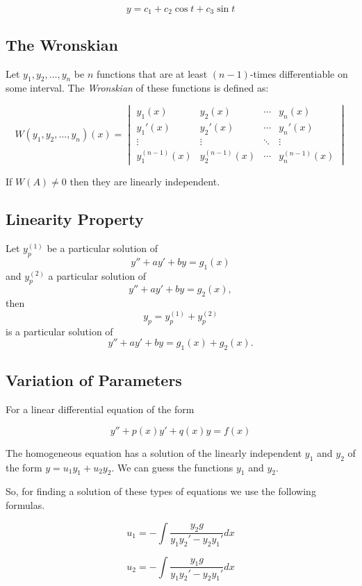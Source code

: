 \[y = c_1 + c_2 \cos t + c_3 \sin t\]

\subsection{The Wronskian}

Let \( y_1, y_2, \ldots, y_n \) be \( n \) functions that are at least 
\( (n-1) \)-times differentiable on some interval. The \emph{Wronskian} of these 
functions is defined as:

\[
W(y_1, y_2, \ldots, y_n)(x) =
\begin{vmatrix}
y_1(x) & y_2(x) & \cdots & y_n(x) \\
y_1'(x) & y_2'(x) & \cdots & y_n'(x) \\
\vdots & \vdots & \ddots & \vdots \\
y_1^{(n-1)}(x) & y_2^{(n-1)}(x) & \cdots & y_n^{(n-1)}(x)
\end{vmatrix}
\]

If \(W(A) \ne 0\) then they are linearly independent.


\subsection{Linearity Property}

Let \( y_p^{(1)} \) be a particular solution of  
\[
y'' + ay' + by = g_1(x)
\]  
and \( y_p^{(2)} \) a particular solution of  
\[
y'' + ay' + by = g_2(x),
\]  
then  
\[
y_p = y_p^{(1)} + y_p^{(2)}
\]  
is a particular solution of  
\[
y'' + ay' + by = g_1(x) + g_2(x).
\]  

\subsection{Variation of Parameters}

For a linear differential equation of the form

\[
y'' + p(x)y' + q(x)y = f(x)
\]

The homogeneous equation has a solution of the linearly independent \(y_1\) and \(y_2\)
of the form \(y = u_1 y_1 + u_2 y_2\). We can guess the functions \(y_1\) and \(y_2\).
\vspace{\baselineskip}

So, for finding a solution of these types of equations we use the following formulas.

\[
u_1 = - \int \frac{y_2 g}{y_1 y_{2}' - y_2 y_{1}'} dx
\]


\[
u_2 = - \int \frac{y_1 g}{y_1 y_{2}' - y_2 y_{1}'} dx
\]

